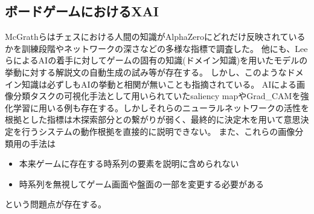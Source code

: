 \subsection{ボードゲームにおけるXAI}
McGrathら\cite{DeepMind}はチェスにおける人間の知識がAlphaZeroにどれだけ反映されているかを訓練段階やネットワークの深さなどの多様な指標で調査した。
他にも、Leeら\cite{DecodeChess}によるAIの着手に対してゲームの固有の知識(ドメイン知識)を用いたモデルの挙動に対する解説文の自動生成の試み等が存在する。
しかし、このようなドメイン知識は必ずしもAIの挙動と相関が無いことも指摘されている\cite{DeepMind}。
AIによる画像分類タスクの可視化手法として用いられていたsaliency map\cite{saliency}やGrad\_CAM\cite{Grad-CAM}を強化学習に用いる例も存在する\cite{gl}\cite{atari-saliency}\cite{visualize}。しかしそれらのニューラルネットワークの活性を根拠とした指標は木探索部分との繋がりが弱く、最終的に決定木を用いて意思決定を行うシステムの動作根拠を直接的に説明できない。
また、これらの画像分類用の手法は
\begin{itemize}
	\item 本来ゲームに存在する時系列の要素を説明に含められない
	\item 時系列を無視してゲーム画面や盤面の一部を変更する必要がある
\end{itemize}
という問題点が存在する。

